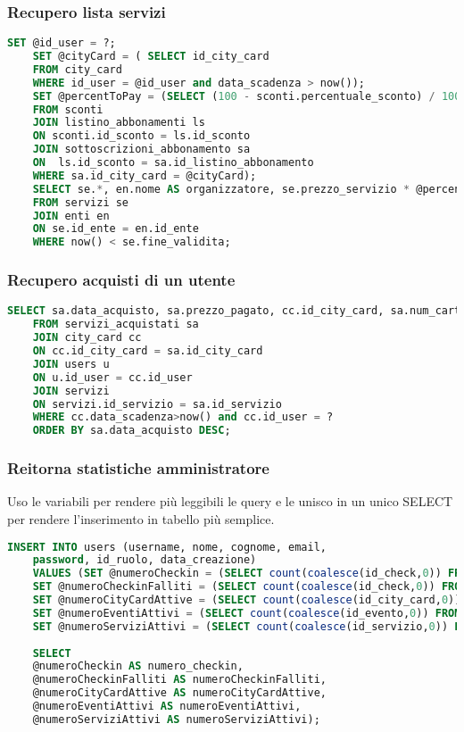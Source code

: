 \subsubsection{Recupero lista servizi}
\begin{lstlisting}[language=SQL]
	SET @id_user = ?;     
	SET @cityCard = ( SELECT id_city_card
	FROM city_card
	WHERE id_user = @id_user and data_scadenza > now());
	SET @percentToPay = (SELECT (100 - sconti.percentuale_sconto) / 100
	FROM sconti 
	JOIN listino_abbonamenti ls 
	ON sconti.id_sconto = ls.id_sconto
	JOIN sottoscrizioni_abbonamento sa
	ON  ls.id_sconto = sa.id_listino_abbonamento
	WHERE sa.id_city_card = @cityCard);
	SELECT se.*, en.nome AS organizzatore, se.prezzo_servizio * @percentToPay AS prezzo_scontato
	FROM servizi se
	JOIN enti en
	ON se.id_ente = en.id_ente
	WHERE now() < se.fine_validita;
\end{lstlisting}

\subsubsection{Recupero acquisti di un utente}
\begin{lstlisting}[language=SQL]
	SELECT sa.data_acquisto, sa.prezzo_pagato, cc.id_city_card, sa.num_carta_credito, servizi.descrizione_servizio AS nome_servizio, u.id_user, sa.id_servizio
	FROM servizi_acquistati sa
	JOIN city_card cc
	ON cc.id_city_card = sa.id_city_card
	JOIN users u
	ON u.id_user = cc.id_user
	JOIN servizi
	ON servizi.id_servizio = sa.id_servizio
	WHERE cc.data_scadenza>now() and cc.id_user = ?
	ORDER BY sa.data_acquisto DESC;
\end{lstlisting}



\subsubsection{Reitorna statistiche amministratore}
Uso le variabili per rendere più leggibili le query e le unisco in un unico SELECT per rendere l'inserimento in tabello più semplice. 
\begin{lstlisting}[language=SQL]
	INSERT INTO users (username, nome, cognome, email,
	password, id_ruolo, data_creazione) 
	VALUES (SET @numeroCheckin = (SELECT count(coalesce(id_check,0)) FROM checks);
	SET @numeroCheckinFalliti = (SELECT count(coalesce(id_check,0)) FROM checks WHERE id_check != 1);
	SET @numeroCityCardAttive = (SELECT count(coalesce(id_city_card,0)) FROM city_card WHERE data_scadenza > now());
	SET @numeroEventiAttivi = (SELECT count(coalesce(id_evento,0)) FROM eventi WHERE fine_validita > now());
	SET @numeroServiziAttivi = (SELECT count(coalesce(id_servizio,0)) FROM servizi WHERE fine_validita > now());
	
	SELECT 
	@numeroCheckin AS numero_checkin,
	@numeroCheckinFalliti AS numeroCheckinFalliti,
	@numeroCityCardAttive AS numeroCityCardAttive,
	@numeroEventiAttivi AS numeroEventiAttivi,
	@numeroServiziAttivi AS numeroServiziAttivi);
\end{lstlisting}





